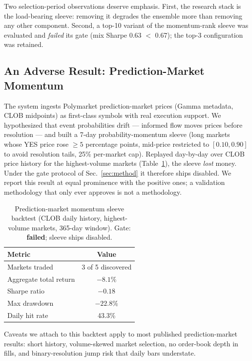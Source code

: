 \documentclass[10pt,twocolumn]{IEEEtran}
\begin{document}
Two selection-period observations deserve emphasis. First, the research
stack is the load-bearing sleeve: removing it degrades the ensemble more
than removing any other component. Second, a top-10 variant of the
momentum-rank sleeve was evaluated and \emph{failed} its gate (mix Sharpe
0.63 $<$ 0.67); the top-3 configuration was retained.

\subsection{An Adverse Result: Prediction-Market Momentum}
\label{sec:polymarket}

The system ingests Polymarket prediction-market prices (Gamma metadata,
CLOB midpoints) as first-class symbols with real execution support. We
hypothesized that event probabilities drift --- informed flow moves prices
before resolution --- and built a 7-day probability-momentum sleeve (long
markets whose YES price rose $\geq 5$ percentage points, mid-price restricted
to $[0.10, 0.90]$ to avoid resolution tails, 25\% per-market cap). Replayed
day-by-day over CLOB price history for the highest-volume markets
(Table~\ref{tab:pm}), the sleeve \emph{lost} money. Under the gate protocol
of Sec.~\ref{sec:method} it therefore ships disabled. We report this result
at equal prominence with the positive ones; a validation methodology that
only ever approves is not a methodology.

\begin{table}[t]
\caption{Prediction-market momentum sleeve backtest (CLOB daily history,
highest-volume markets, 365-day window). Gate: \textbf{failed}; sleeve
ships disabled.}
\label{tab:pm}
\centering
\begin{tabular}{lc}
\toprule
Metric & Value \\
\midrule
Markets traded & 3 of 5 discovered \\
Aggregate total return & $-8.1\%$ \\
Sharpe ratio & $-0.18$ \\
Max drawdown & $-22.8\%$ \\
Daily hit rate & 43.3\% \\
\bottomrule
\end{tabular}
\end{table}

Caveats we attach to this backtest apply to most published
prediction-market results: short history, volume-skewed market selection,
no order-book depth in fills, and binary-resolution jump risk that daily
bars understate.
\end{document}
